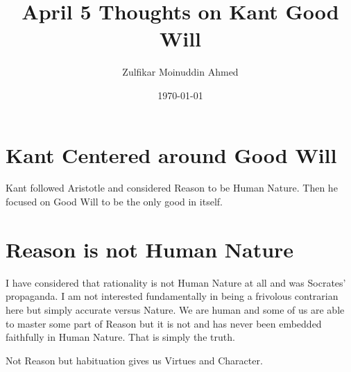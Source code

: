 \documentclass{amsart}
\title{April 5 Thoughts on Kant Good Will}
\author{Zulfikar Moinuddin Ahmed}
\date{\today}
\begin{document}
\maketitle
\section{Kant Centered around Good Will}

Kant followed Aristotle and considered Reason to be Human Nature.  Then he focused on Good Will to be the only good in itself.

\section{Reason is not Human Nature}

I have considered that rationality is not Human Nature at all and was Socrates' propaganda.  I am not interested fundamentally in being a frivolous contrarian here but simply accurate versus Nature.  We are human and some of us are able to master some part of Reason but it is not and has never been embedded faithfully in Human Nature.  That is simply the truth.  

Not Reason but habituation gives us Virtues and Character.  
\end{document}

